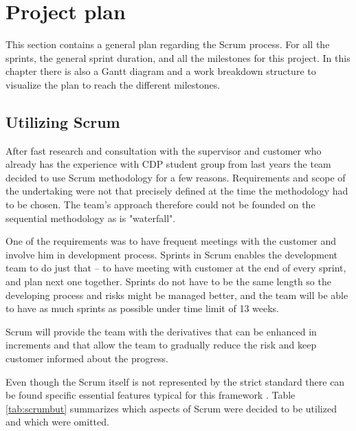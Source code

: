 \section{Project plan}
This section contains a general plan regarding the Scrum process. For all the sprints, the general sprint duration, and all the milestones for this project. In this chapter there is also a Gantt diagram and a work breakdown structure to visualize the plan to reach the different milestones.

\subsection{Utilizing Scrum} \label{txt:utilizing_scrum}

After fast research and consultation with the supervisor and customer who already has the experience with CDP student group from last years the team decided to use Scrum methodology for a few reasons. Requirements and scope of the undertaking were not that precisely defined at the time the methodology had to be chosen. The team's approach therefore could not be founded on the sequential methodology as is "waterfall". 

One of the requirements was to have frequent meetings with the customer and involve him in development process. Sprints in Scrum enables the development team to do just that --
to have meeting with customer at the end of every sprint, and plan next one together. Sprints do not have to be the same length so the developing process and risks might be managed better, and the team will be able to have as much sprints as possible under time limit of 13 weeks. 

Scrum will provide the team with the derivatives that can be enhanced in increments and that allow the team to gradually reduce the risk and keep customer informed about the progress.

Even though the Scrum itself is not represented by the strict standard there can be found specific essential features typical for this framework \cite{TheScrumGuide} \cite[p. 15, p. 97, p. 154]{viscardi2013professional}. Table \ref{tab:scrumbut} summarizes which aspects of Scrum were decided to be utilized and which were omitted. 

